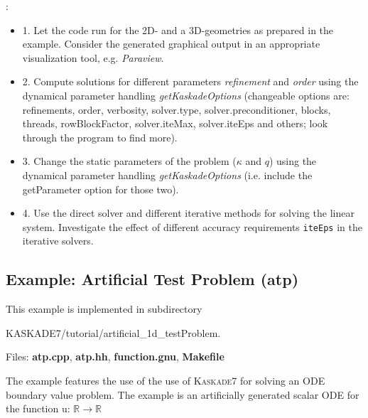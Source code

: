 \documentclass[11pt]{article}
\newcommand{\R}{\mathbb{R}}
\newcommand{\K}{\textsc{Kaskade7 }}
\begin{document}
:
\begin{itemize}
\item 1. Let the code run for the 2D- and a 3D-geometries as prepared in the example.
Consider the generated graphical output in an appropriate visualization tool, e.g. {\em Paraview}.
\item 2. Compute solutions for different parameters {\em refinement} and {\em order} using the 
dynamical parameter handling {\em getKaskadeOptions} (changeable options are: refinements, order, verbosity, solver.type, solver.preconditioner, blocks, threads, rowBlockFactor, solver.iteMax, solver.iteEps and others; look through the program to find more).
\item 3. Change the static parameters of the problem ({$\kappa$} and {$q$}) using the 
dynamical parameter handling {\em getKaskadeOptions} (i.e. include the getParameter option for those two).
\item 4. Use the direct solver and different iterative methods for solving the linear system.
Investigate the effect of different accuracy requirements {\tt iteEps} in the iterative solvers.
\end{itemize}

\subsection{Example: Artificial Test Problem (atp)}\label{atp}

This example is implemented in subdirectory 
\begin{center} KASKADE7/tutorial/artificial\_1d\_testProblem.\end{center}

\noindent Files: {\bf atp.cpp}, {\bf atp.hh}, {\bf function.gnu}, {\bf Makefile}

The example features the use of the use of \K for solving an ODE boundary value problem.
The example is an artificially generated scalar ODE for the function u: $\R \rightarrow \R$
\end{document}
